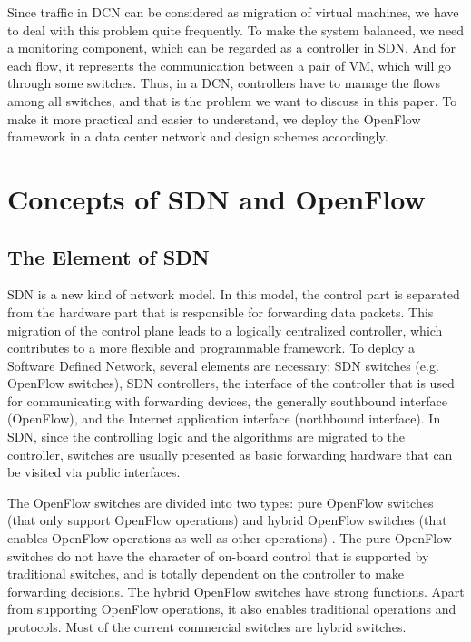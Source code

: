 Since traffic in DCN can be considered as migration of virtual machines, we have to deal with this problem quite frequently. To make the system balanced, we need a monitoring component, which can be regarded as a controller in SDN. And for each flow, it represents the communication between a pair of VM, which will go through some switches. Thus, in a DCN, controllers have to manage the flows among all switches, and that is the problem we want to discuss in this paper. To make it more practical and easier to understand, we deploy the OpenFlow framework in a data center network and design schemes accordingly.

\section{Concepts of SDN and OpenFlow}
\label{sec:Concepts of SDN and OpenFlow}

\subsection{The Element of SDN}
\label{sec:The Element of SDN}
SDN is a new kind of network model. In this model, the control part is separated from the hardware part that is responsible for forwarding data packets. This migration of the control plane leads to a logically centralized controller, which contributes to a more flexible and programmable framework. To deploy a Software Defined Network, several elements are necessary: SDN switches (e.g. OpenFlow switches), SDN controllers, the interface of the controller that is used for communicating with forwarding devices, the generally southbound interface (OpenFlow), and the Internet application interface (northbound interface). In SDN, since the controlling logic and the algorithms are migrated to the controller, switches are usually presented as basic forwarding hardware that can be visited via public interfaces.

The OpenFlow switches are divided into two types: pure OpenFlow switches (that only support OpenFlow operations) and hybrid OpenFlow switches  (that enables OpenFlow operations as well as other operations) \cite{openbook}. The pure OpenFlow switches do not have the character of on-board control that is supported by traditional switches, and is totally dependent on the controller to make forwarding decisions. The hybrid OpenFlow switches have strong functions. Apart from supporting OpenFlow operations, it also enables traditional operations and protocols. Most of the current commercial switches are hybrid switches.


